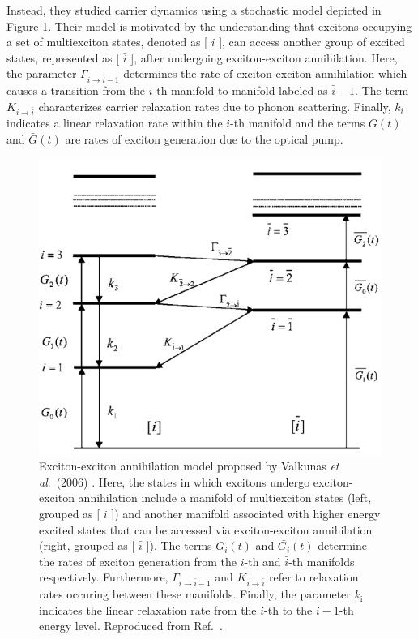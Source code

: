 Instead, they studied carrier dynamics using a stochastic model depicted in Figure \ref{fig:exciton_manif_valkunas}. Their model is motivated by the understanding that excitons occupying a set of multiexciton states, denoted as [ $i$ ], can access another group of excited states, represented as [ $\displaystyle\bar{i}$ ], after undergoing exciton-exciton annihilation. Here, the parameter $\Gamma_{i \rightarrow \bar{i}-1}$ determines the rate of exciton-exciton annihilation which causes a transition from the $i$-th manifold to manifold labeled as $\bar{i} - 1$. The term $K_{i \rightarrow \bar{i}}$ characterizes carrier relaxation rates due to phonon scattering. Finally, $k_i$ indicates a linear relaxation rate within the $i$-th manifold and the terms $G(t)$ and $\bar{G}(t)$ are rates of exciton generation due to the optical pump.

\begin{figure}[H]
	\centering
	\includegraphics[scale=0.5]{images/chapter_prior_works/exciton_manifold_valkunas_2006}
	\caption{Exciton-exciton annihilation model proposed by Valkunas \textit{et al}.\ (2006) \cite{valkunas2006exciton}. Here, the states in which excitons undergo exciton-exciton annihilation include a manifold of multiexciton states (left, grouped as [ $i$ ]) and another manifold associated with higher energy excited states that can be accessed via exciton-exciton annihilation (right, grouped as [ $\bar{i}$ ]). The terms $G_{i}(t)$ and $\bar{G_{i}}(t)$ determine the rates of exciton generation from the $i$-th and $\bar{i}$-th manifolds respectively. Furthermore, $\Gamma_{i \rightarrow \bar{i}-1}$ and $K_{i \rightarrow \bar{i}}$ refer to relaxation rates occuring between these manifolds. Finally, the parameter $k_\text{i}$ indicates the linear relaxation rate from the $i$-th to the $i-1$-th energy level. Reproduced from Ref.\ \cite{valkunas2006exciton}. }
	\label{fig:exciton_manif_valkunas}
\end{figure}

